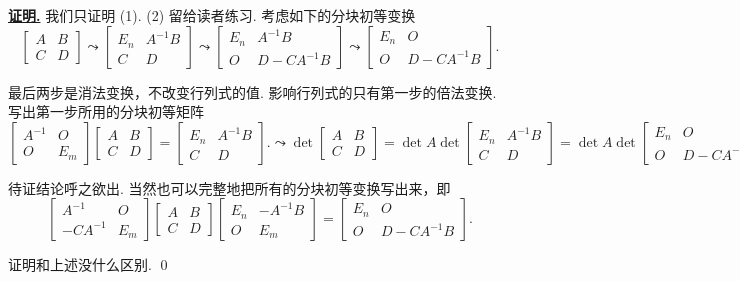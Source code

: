 \documentclass[10pt,openany]{article}
\theoremstyle{thmstyle} %
\theoremstyle{defstyle} %
\theoremstyle{prostyle} %
\theoremstyle{exastyle}
\theoremstyle{remstyle}
\renewenvironment{proof}[1][证明]{\par\underline{\textbf{#1.}} \;\fangsong}{\qed\par}
\begin{document}
\begin{proof}
	我们只证明 (1). (2) 留给读者练习. 考虑如下的分块初等变换
	\[ \begin{bmatrix}
		A & B \\ C & D
	\end{bmatrix} \leadsto \begin{bmatrix}
	E_n & A^{-1}B \\ C & D
	\end{bmatrix} \leadsto \begin{bmatrix}
	E_n & A^{-1}B \\ O & D-CA^{-1}B
	\end{bmatrix} \leadsto \begin{bmatrix}
	E_n & O \\ O & D-CA^{-1}B
	\end{bmatrix}. \]
	
	最后两步是消法变换，不改变行列式的值. 影响行列式的只有第一步的倍法变换. 写出第一步所用的分块初等矩阵
	\[ \begin{bmatrix}
		A^{-1} & O \\ O & E_m
	\end{bmatrix} \begin{bmatrix}
		A & B \\ C & D
	\end{bmatrix}=\begin{bmatrix}
	E_n & A^{-1}B \\ C & D
	\end{bmatrix}. \leadsto \det \begin{bmatrix}
	A & B \\ C & D
	\end{bmatrix}= \det A \det \begin{bmatrix}
	E_n & A^{-1}B \\ C & D
	\end{bmatrix}= \det A \det \begin{bmatrix}
	E_n & O \\ O & D-CA^{-1}B
	\end{bmatrix}. \]
	
	待证结论呼之欲出. 当然也可以完整地把所有的分块初等变换写出来，即
	\[ \begin{bmatrix}
		A^{-1} & O \\ -CA^{-1} & E_m
	\end{bmatrix} \begin{bmatrix}
		A & B \\ C & D
	\end{bmatrix}\begin{bmatrix}
	E_n & -A^{-1}B \\ O & E_m
	\end{bmatrix}=\begin{bmatrix}
	E_n & O \\ O & D-CA^{-1}B
	\end{bmatrix}. \]
	
	证明和上述没什么区别.
\end{proof}
\end{document}
